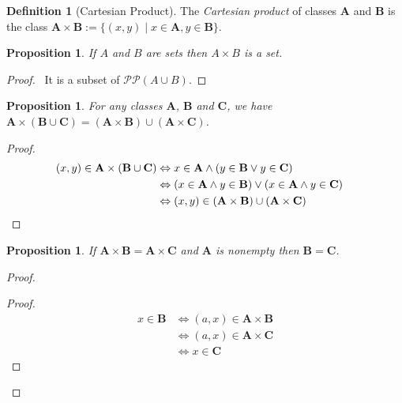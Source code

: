\documentclass{book}
\let\qed\relax
\newtheorem{prop}[ax]{Proposition}
\theoremstyle{definition}
\newtheorem{df}[ax]{Definition}
\begin{document}
\begin{df}[Cartesian Product]
The \emph{Cartesian product} of classes $\mathbf{A}$ and $\mathbf{B}$ is the class $\mathbf{A} \times \mathbf{B} := \{(x,y) \mid x \in \mathbf{A}, y \in \mathbf{B}\}$.
\end{df}

\begin{prop}
If $A$ and $B$ are sets then $A \times B$ is a set.
\end{prop}

\begin{proof}
\pf\ It is a subset of $\mathcal{P} \mathcal{P} (A \cup B)$. \qed
\end{proof}

\begin{prop}
For any classes $\mathbf{A}$, $\mathbf{B}$ and $\mathbf{C}$, we have $\mathbf{A} \times (\mathbf{B} \cup \mathbf{C}) = (\mathbf{A} \times \mathbf{B}) \cup (\mathbf{A} \times \mathbf{C})$.
\end{prop}

\begin{proof}
\pf
\begin{align*}
(x,y) \in \mathbf{A} \times (\mathbf{B} \cup \mathbf{C}) & \Leftrightarrow x \in \mathbf{A} \wedge (y \in \mathbf{B} \vee y \in \mathbf{C}) \\
& \Leftrightarrow (x \in \mathbf{A} \wedge y \in \mathbf{B}) \vee (x \in \mathbf{A} \wedge y \in \mathbf{C}) \\
& \Leftrightarrow (x,y) \in (\mathbf{A} \times \mathbf{B}) \cup (\mathbf{A} \times \mathbf{C}) & \qed
\end{align*}
\end{proof}

\begin{prop}
If $\mathbf{A} \times \mathbf{B} = \mathbf{A} \times \mathbf{C}$ and $\mathbf{A}$ is nonempty then $\mathbf{B} = \mathbf{C}$.
\end{prop}

\begin{proof}
\pf
{}
\begin{proof}
	\pf
	\begin{align*}
		x \in \mathbf{B} & \Leftrightarrow (a,x) \in \mathbf{A} \times \mathbf{B} \\
		& \Leftrightarrow (a,x) \in \mathbf{A} \times \mathbf{C} \\
		& \Leftrightarrow x \in \mathbf{C}
	\end{align*}
\end{proof}
\qed
\end{proof}
\end{document}
